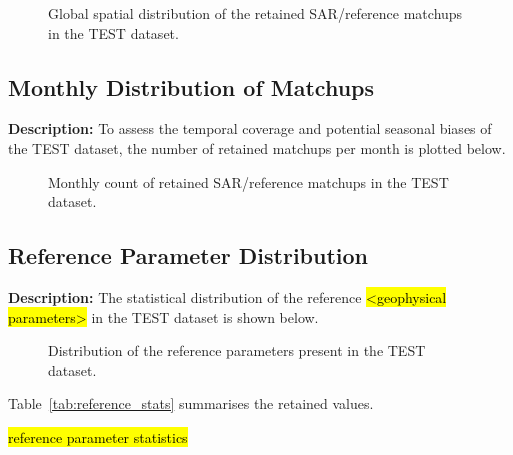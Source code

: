 \documentclass[11pt,a4paper]{article}
\begin{document}
\begin{figure}[H]
    \centering
    \caption{Global spatial distribution of the retained SAR/reference matchups in the TEST dataset.}
    \label{fig:coverage_map}
\end{figure}

\subsection{Monthly Distribution of Matchups}
\textbf{Description:} To assess the temporal coverage and potential seasonal biases of the TEST dataset, the number of retained matchups per month is plotted below.

\begin{figure}[H]
    \centering
    \caption{Monthly count of retained SAR/reference matchups in the TEST dataset.}
    \label{fig:monthly_distribution}
\end{figure}

\subsection{Reference Parameter Distribution}
\textbf{Description:} The statistical distribution of the reference \hl{<geophysical parameters>}  in the TEST dataset is shown below.

\begin{figure}[H]
    \centering
    \caption{Distribution of the reference parameters present in the TEST dataset.}
    \label{fig:ref_distribution}
\end{figure}

Table~\ref{tab:reference_stats} summarises the retained values.

\hl{reference parameter statistics}
\end{document}
